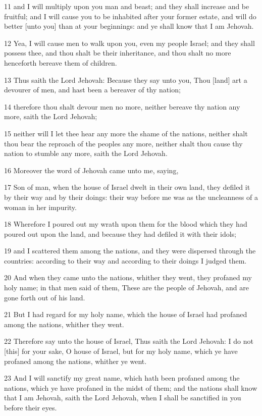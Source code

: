 \par 11 and I will multiply upon you man and beast; and they shall increase and be fruitful; and I will cause you to be inhabited after your former estate, and will do better [unto you] than at your beginnings: and ye shall know that I am Jehovah.
\par 12 Yea, I will cause men to walk upon you, even my people Israel; and they shall possess thee, and thou shalt be their inheritance, and thou shalt no more henceforth bereave them of children.
\par 13 Thus saith the Lord Jehovah: Because they say unto you, Thou [land] art a devourer of men, and hast been a bereaver of thy nation;
\par 14 therefore thou shalt devour men no more, neither bereave thy nation any more, saith the Lord Jehovah;
\par 15 neither will I let thee hear any more the shame of the nations, neither shalt thou bear the reproach of the peoples any more, neither shalt thou cause thy nation to stumble any more, saith the Lord Jehovah.
\par 16 Moreover the word of Jehovah came unto me, saying,
\par 17 Son of man, when the house of Israel dwelt in their own land, they defiled it by their way and by their doings: their way before me was as the uncleanness of a woman in her impurity.
\par 18 Wherefore I poured out my wrath upon them for the blood which they had poured out upon the land, and because they had defiled it with their idols;
\par 19 and I scattered them among the nations, and they were dispersed through the countries: according to their way and according to their doings I judged them.
\par 20 And when they came unto the nations, whither they went, they profaned my holy name; in that men said of them, These are the people of Jehovah, and are gone forth out of his land.
\par 21 But I had regard for my holy name, which the house of Israel had profaned among the nations, whither they went.
\par 22 Therefore say unto the house of Israel, Thus saith the Lord Jehovah: I do not [this] for your sake, O house of Israel, but for my holy name, which ye have profaned among the nations, whither ye went.
\par 23 And I will sanctify my great name, which hath been profaned among the nations, which ye have profaned in the midst of them; and the nations shall know that I am Jehovah, saith the Lord Jehovah, when I shall be sanctified in you before their eyes.
